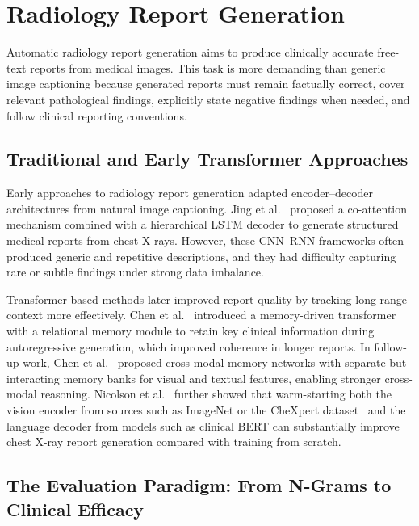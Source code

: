 \section{Radiology Report Generation}\label{sec:rw_reportgen}

Automatic radiology report generation aims to produce clinically accurate free-text reports from medical images. This task is more demanding than generic image captioning because generated reports must remain factually correct, cover relevant pathological findings, explicitly state negative findings when needed, and follow clinical reporting conventions.

\subsection{Traditional and Early Transformer Approaches}

Early approaches to radiology report generation adapted encoder--decoder architectures from natural image captioning. Jing et al.~\cite{jing2018automatic} proposed a co-attention mechanism combined with a hierarchical LSTM decoder to generate structured medical reports from chest X-rays. However, these CNN--RNN frameworks often produced generic and repetitive descriptions, and they had difficulty capturing rare or subtle findings under strong data imbalance.

Transformer-based methods later improved report quality by tracking long-range context more effectively. Chen et al.~\cite{chen2020generating} introduced a memory-driven transformer with a relational memory module to retain key clinical information during autoregressive generation, which improved coherence in longer reports. In follow-up work, Chen et al.~\cite{chen2022crossmodal} proposed cross-modal memory networks with separate but interacting memory banks for visual and textual features, enabling stronger cross-modal reasoning. Nicolson et al.~\cite{nicolson2023improving} further showed that warm-starting both the vision encoder from sources such as ImageNet or the CheXpert dataset~\cite{irvin2019chexpert} and the language decoder from models such as clinical BERT can substantially improve chest X-ray report generation compared with training from scratch.

\subsection{The Evaluation Paradigm: From N-Grams to Clinical Efficacy}

